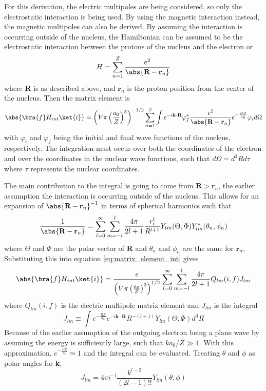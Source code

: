For this derivation, the electric multipoles are being considered, so only the electrostatic interaction is being used. By using the magnetic interaction instead, the magnetic multipoles can also be derived. By assuming the interaction is occurring outside of the nucleus, the Hamiltonian can be assumed to be the electrostatic interaction between the protons of the nucleus and the electron or
\begin{equation}
    H=\sum_{n=1}^Z \frac{e^2}{\abs{\textbf{R}-\textbf{r}_n}}
\end{equation}
where \textbf{R} is as described above, and $\textbf{r}_n$ is the proton position from the center of the nucleus. Then the matrix element is
\begin{equation}
\label{eq:matrix_element_int}
    \abs{\bra{f}H_{int}\ket{i}} = \left(V\pi\left(\frac{a_0}{Z}\right)^3\right)^{-1/2} \sum_{n=1}^Z \int e^{-i\textbf{k}\cdot\textbf{R}}\varphi_{f}^* \frac{e^2}{\abs{\textbf{R}-\textbf{r}_n}} e^{-\frac{RZ}{a_0}}\varphi_{i}d\Omega
\end{equation}
with $\varphi_{i}$ and $\varphi_{f}$ being the initial and final wave functions of the nucleus, respectively. The integration must occur over both the coordinates of the electron and over the coordinates in the nuclear wave functions, such that $d\Omega=d^3Rd\tau$ where $\tau$ represents the nuclear coordinates.

The main contribution to the integral is going to come from $\textbf{R}>\textbf{r}_n$, the earlier assumption the interaction is occurring outside of the nucleus. This allows for an expansion of $\abs{\textbf{R}-\textbf{r}_n}^{-1}$ in terms of spherical harmonics such that
\begin{equation}
\label{eq:expansion_Rri}
    \frac{1}{\abs{\textbf{R}-\textbf{r}_n}} = \sum_{l=0}^\infty\sum_{m=-l}^{l}\frac{4\pi}{2l+1}\frac{r_i^l}{R^{l+1}}Y_{lm}(\Theta,\Phi)Y_{lm}^{*}(\theta_n,\phi_n)
\end{equation}
where $\Theta$ and $\Phi$ are the polar vector of \textbf{R} and $\theta_n$ and $\phi_n$ are the same for $\textbf{r}_n$. Substituting this into equation \ref{eq:matrix_element_int} gives
\begin{equation}
    
    \abs{\bra{f}H_{int}\ket{i}} = \frac{e}{ \left(V\pi\left(\frac{a_0}{Z}\right)^3\right)^{1/2}} \sum_{l=0}^\infty\sum_{m=-l}^{l}\frac{4\pi}{2l+1} Q_{lm}(i,f)J_{lm}
\end{equation}
where $Q_{lm}(i,f)$ is the electric multipole matrix element and $J_{lm}$ is the integral
\begin{equation}
    J_{lm}\equiv\int e^{-\frac{RZ}{a_0}}e^{-i\textbf{k}\cdot\textbf{R}}R^{-(l+1)}Y_{lm}(\Theta,\Phi)d^3R
\end{equation}
Because of the earlier assumption of the outgoing electron being a plane wave by assuming the energy is sufficiently large, such that $ka_0/Z\gg1$. With this approximation, $e^{-\frac{RZ}{a_0}}\simeq1$ and the integral can be evaluated. Treating $\theta$ and $\phi$ as polar angles for \textbf{k}, 
\begin{equation}
    J_{lm}=4\pi i^{-l}\frac{k^{l-2}}{(2l-1)!!}Y_{lm}(\theta,\phi)
\end{equation}

